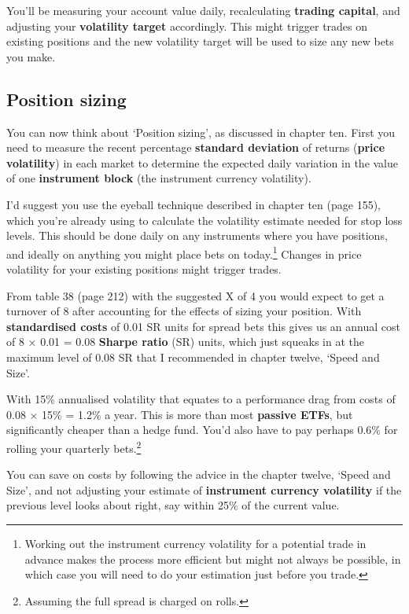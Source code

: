 You'll be measuring your account value daily, recalculating \textbf{trading capital}, and adjusting your \textbf{volatility target} accordingly. This might trigger trades on existing positions and the new volatility target will be used to size any new bets you make.

\subsection*{Position sizing}

You can now think about ‘Position sizing', as discussed in chapter ten. First you need to measure the recent percentage \textbf{standard deviation} of returns (\textbf{price volatility}) in each market to determine the expected daily variation in the value of one \textbf{instrument block} (the instrument currency volatility).

I'd suggest you use the eyeball technique described in chapter ten (page 155), which you're already using to calculate the volatility estimate needed for stop loss levels. This should be done daily on any instruments where you have positions, and ideally on anything you might place bets on today.\footnote{Working out the instrument currency volatility for a potential trade in advance makes the process more efficient but might not always be possible, in which case you will need to do your estimation just before you trade.} Changes in price volatility for your existing positions might trigger trades.

From table 38 (page 212) with the suggested X of 4 you would expect to get a turnover of 8 after accounting for the effects of sizing your position. With \textbf{standardised costs} of 0.01 SR units for spread bets this gives us an annual cost of 8 × 0.01 = 0.08 \textbf{Sharpe ratio} (SR) units, which just squeaks in at the maximum level of 0.08 SR that I recommended in chapter twelve, ‘Speed and Size'.

With 15\% annualised volatility that equates to a performance drag from costs of 0.08 × 15\% = 1.2\% a year. This is more than most \textbf{passive ETFs}, but significantly cheaper than a hedge fund. You'd also have to pay perhaps 0.6\% for rolling your quarterly bets.\footnote{Assuming the full spread is charged on rolls.}

You can save on costs by following the advice in the chapter twelve, ‘Speed and Size', and not adjusting your estimate of \textbf{instrument currency volatility} if the previous level looks about right, say within 25\% of the current value.

